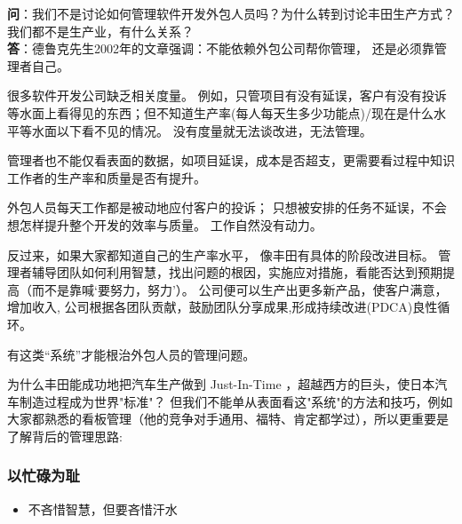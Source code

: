 \textbf{问}：我们不是讨论如何管理软件开发外包人员吗？为什么转到讨论丰田生产方式？
我们都不是生产业，有什么关系？\\
\textbf{答}：德鲁克先生2002年的文章强调：不能依赖外包公司帮你管理，
还是必须靠管理者自己。

很多软件开发公司缺乏相关度量。
例如，只管项目有没有延误，客户有没有投诉等水面上看得见的东西；但不知道生产率(每人每天生多少功能点)/现在是什么水平等水面以下看不见的情况。
没有度量就无法谈改进，无法管理。

管理者也不能仅看表面的数据，如项目延误，成本是否超支，更需要看过程中知识工作者的生产率和质量是否有提升。

外包人员每天工作都是被动地应付客户的投诉；
只想被安排的任务不延误，不会想怎样提升整个开发的效率与质量。
工作自然没有动力。

反过来，如果大家都知道自己的生产率水平， 像丰田有具体的阶段改进目标。
管理者辅导团队如何利用智慧，找出问题的根因，实施应对措施，看能否达到预期提高（而不是靠喊`要努力，努力'）。
公司便可以生产出更多新产品，使客户满意，增加收入,
公司根据各团队贡献，鼓励团队分享成果,形成持续改进(PDCA)良性循环。

有这类``系统''才能根治外包人员的管理问题。

为什么丰田能成功地把汽车生产做到 Just-In-Time
，超越西方的巨头，使日本汽车制造过程成为世界"标准"？
但我们不能单从表面看这"系统"的方法和技巧，例如大家都熟悉的看板管理（他的竞争对手通用、福特、肯定都学过），所以更重要是了解背后的管理思路:\\

\hypertarget{ux4ee5ux5fd9ux788cux4e3aux803b}{%
\subsubsection{以忙碌为耻}\label{ux4ee5ux5fd9ux788cux4e3aux803b}}

\begin{itemize}
\tightlist
\item
  不吝惜智慧，但要吝惜汗水
\end{itemize}


